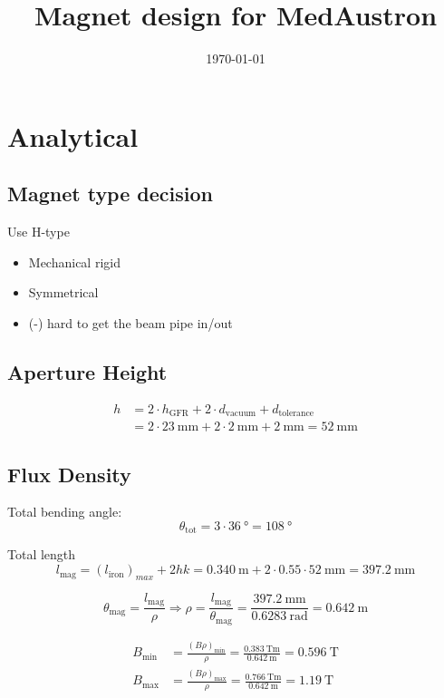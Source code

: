 \documentclass[10pt,a4paper,noendnumber=true]{scrartcl}
\title{Magnet design for MedAustron}
\subtitle{}
\author{}
\date{\today}
\begin{document}
\maketitle

\section{Analytical}

\subsection{Magnet type decision}
Use H-type
\begin{itemize}
\item Mechanical rigid
\item Symmetrical
\item (-) hard to get the beam pipe in/out
\end{itemize}

\subsection{Aperture Height}
\begin{align}
    h &= 2\cdot h_\text{GFR} + 2\cdot d_\text{vacuum} + d_\text{tolerance} \\
      &= 2\cdot\SI{23}{\mm} + 2\cdot \SI{2}{\mm} + \SI{2}{\mm} = \SI{52}{\mm}
\end{align}

\subsection{Flux Density}
Total bending angle:
\begin{equation}
    \theta_\text{tot} = 3 \cdot \SI{36}{\degree} = \SI{108}{\degree}
\end{equation}

Total length
\begin{equation}
    l_\text{mag} = (l_\text{iron})_{max} + 2hk = \SI{0.340}{\meter} + 2\cdot 0.55 \cdot \SI{52}{\mm} = \SI{397.2}{\mm}
\end{equation}

\begin{equation}
    \theta_\text{mag} = \frac{l_\text{mag}}{\rho} \Rightarrow \rho = \frac{l_\text{mag}}{\theta_\text{mag}} = \frac{\SI{397.2}{\mm}}{\SI{0.6283}{\radian}} = \SI{0.642}{\meter}
\end{equation}

\begin{align}
    B_\text{min} &= \frac{(B \rho)_\text{min}}{\rho} = \frac{\SI{0.383}{\tesla\meter}}{\SI{0.642}{\meter}} = \SI{0.596}{\tesla}\\
    B_\text{max} &= \frac{(B \rho)_\text{max}}{\rho} = \frac{\SI{0.766}{\tesla\meter}}{\SI{0.642}{\meter}} = \SI{1.19}{\tesla}
\end{align}
\end{document}
